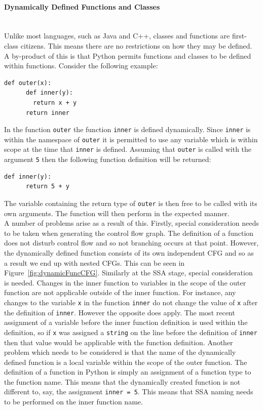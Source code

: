 \documentclass[12pt, titlepage]{article}
\begin{document}
\paragraph*{Dynamically Defined Functions and Classes} \mbox{} \\
Unlike most languages, such as Java and C++, classes and functions are first-class citizens. This means there are no restrictions on how they may be defined. A by-product of this is that Python permits functions and classes to be defined within functions. Consider the following example:
\begin{lstlisting}[mathescape]
    def outer(x):
      def inner(y):
        return x + y
      return inner
\end{lstlisting}
In the function \texttt{outer} the function \texttt{inner} is defined dynamically. Since \texttt{inner} is within the namespace of \texttt{outer} it is permitted to use any variable which is within scope at the time that \texttt{inner} is defined. Assuming that \texttt{outer} is called with the argument \texttt{5} then the following function definition will be returned:
\begin{lstlisting}[mathescape]
    def inner(y):
      return 5 + y
\end{lstlisting}
The variable containing the return type of \texttt{outer} is then free to be called with its own arguments. The function will then perform in the expected manner. \\
\indent A number of problems arise as a result of this. Firstly, special consideration needs to be taken when generating the control flow graph. The definition of a function does not disturb control flow and so not branching occurs at that point. However, the dynamically defined function consists of its own independent CFG and so as a result we end up with nested CFGs. This can be seen in Figure~\ref{fig:dynamicFuncCFG}. Similarly at the SSA stage, special consideration is needed. Changes in the inner function to variables in the scope of the outer function are not applicable outside of the inner function. For instance, any changes to the variable \texttt{x} in the function \texttt{inner} do not change the value of \texttt{x} after the definition of \texttt{inner}. However the opposite does apply. The most recent assignment of a variable before the inner function definition is used within the definition, so if \texttt{x} was assigned a \texttt{string} on the line before the definition of \texttt{inner} then that value would be applicable with the function definition. Another problem which needs to be considered is that the name of the dynamically defined function is a local variable within the scope of the outer function. The definition of a function in Python is simply an assignment of a function type to the function name. This means that the dynamically created function is not different to, say, the assignment \texttt{inner = 5}. This means that SSA naming needs to be performed on the inner function name. \\
\end{document}
